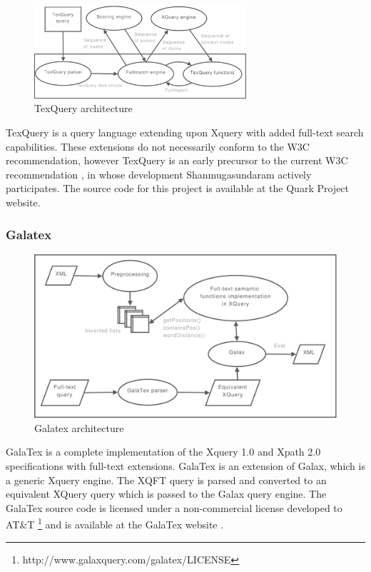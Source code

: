 \begin{figure}[!h]
  \centering
    \includegraphics[width=0.7\textwidth]{diagrams/texquery_arch}
  \caption{TexQuery architecture}
\end{figure}

TexQuery is a query language extending upon Xquery with added full-text search 
capabilities. These extensions do not necessarily conform to the W3C
recommendation, however TexQuery is an early precursor to the current W3C 
recommendation \cite{TEXQ00}, in whose development Shanmugasundaram actively 
participates. The source code for this project is available at the Quark Project
website\cite{quarkproject}.

\subsubsection{Galatex}
\begin{figure}[!h]
  \centering
    \includegraphics[width=1\textwidth]{diagrams/galatex_arch}
  \caption{Galatex architecture}
\end{figure}

GalaTex is a complete implementation of the Xquery 1.0 and Xpath 2.0
specifications with full-text extensions. GalaTex is an extension of Galax,
which is a generic Xquery engine. The XQFT query is parsed and converted to an
equivalent XQuery query which is passed to the Galax query engine. The GalaTex
source code is licensed under a non-commercial license developed to AT\&{}T 
\footnote{http://www.galaxquery.com/galatex/LICENSE} and is available at the
GalaTex website \cite{galatex}.


